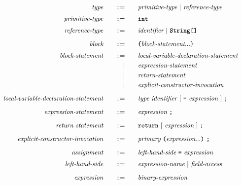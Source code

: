 \begin{alignat*}{9}
&& \textit{type}                                 && \quad ::= & \quad && \textit{primitive-type} \ | \ \textit{reference-type} && \\[1mm]
&& \textit{primitive-type}                       && \quad ::= & \quad && \textbf{\texttt{int}} && \\[1mm]
&& \textit{reference-type}                       && \quad ::= & \quad && \textit{identifier} \ | \ \textbf{\texttt{String[]}} && \\[2mm]
&& \textit{block}                                && \quad ::= & \quad && \textbf{\texttt{\{}} \textit{block-statement} ... \textbf{\texttt{\}}} && \\[1mm]
&& \textit{block-statement}                      && \quad ::= & \quad && \textit{local-variable-declaration-statement} && \\
&&                                               &&         | & \quad && \textit{expression-statement} && \\
&&                                               &&         | & \quad && \textit{return-statement} && \\
&&                                               &&         | & \quad && \textit{explicit-constructor-invocation} && \\[2mm]
&& \textit{local-variable-declaration-statement} && \quad ::= & \quad && \textit{type} \ \textit{identifier} \ [ \ \textbf{\texttt{=}} \ \textit{expression} \ ] \ \textbf{\texttt{;}} && \\[2mm]
&& \textit{expression-statement}                 && \quad ::= & \quad && \textit{expression} \ \textbf{\texttt{;}} && \\[2mm]
&& \textit{return-statement}                     && \quad ::= & \quad && \textbf{\texttt{return}} \ [ \ \textit{expression} \ ] \ \textbf{\texttt{;}} && \\[2mm]
&& \textit{explicit-constructor-invocation}      && \quad ::= & \quad && \textit{primary} \ \textbf{\texttt{(}} \textit{expression} ... \textbf{\texttt{)}} \ \textbf{\texttt{;}} && \\[2mm]
&& \textit{assignment}                           && \quad ::= & \quad && \textit{left-hand-side} \ \textbf{\texttt{=}} \ \textit{expression} && \\[1mm]
&& \textit{left-hand-side}                       && \quad ::= & \quad && \textit{expression-name} \ | \ \textit{field-access} && \\[2mm]
&& \textit{expression}                           && \quad ::= & \quad && \textit{binary-expression} && \\

\end{alignat*}

